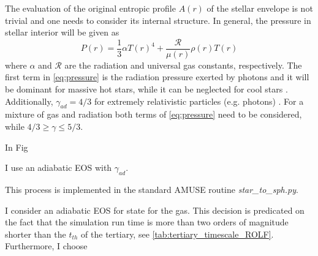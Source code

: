 The evaluation of the original entropic profile $A(r)$ of the stellar envelope is not trivial and one needs to consider its internal structure. In general, the pressure in stellar interior will be given as 
\begin{equation}\label{eq:pressure}
    P(r) = \frac{1}{3} \alpha T(r)^4+ \frac{\mathcal{R}}{\mu(r)} \rho(r) T(r)
\end{equation}
where $\alpha$ and $\mathcal{R}$ are the radiation and universal gas constants, respectively. The first term in \cref{eq:pressure} is the radiation pressure exerted by photons and it will be dominant for massive hot stars, while it can be neglected for cool stars \citep{pols2011stellar}. Additionally, $\gamma_{ad} = 4/3$ for extremely relativistic particles (e.g. photons) \citep{pols2011stellar}. For a mixture of gas and radiation both terms of \cref{eq:pressure} need to be considered, while $4/3 \geq \gamma \leq 5/3$.

In Fig


I use an adiabatic EOS with $\gamma_{ad}$.




This process is implemented in the standard AMUSE routine {\it star\_to\_sph.py}. 










I consider an adiabatic EOS for state for the gas. This decision is predicated on the fact that the simulation run time is more than two orders of magnitude shorter than the $t_{th}$ of the tertiary, see \cref{tab:tertiary_timescale_ROLF}. Furthermore, I choose 






